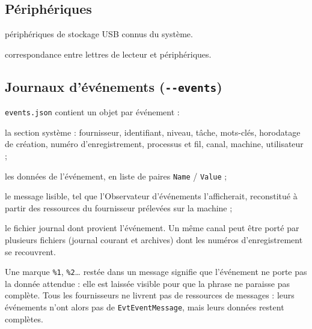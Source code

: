 \documentclass[11pt,a4paper,oneside]{report}
\newcommand{\opt}[1]{\texttt{-{}-#1}}
\newcommand{\champ}[1]{\texttt{#1}}
\newcommand{\fichier}[1]{\texttt{#1}}
\begin{document}
\subsection{Périphériques}

\begin{description}[style=nextline,leftmargin=1.2em]
  \item[\fichier{Usbstor.json}] périphériques de stockage USB connus du système.
  \item[\fichier{mounted\_device.json}] correspondance entre lettres de lecteur et
        périphériques.
\end{description}

\subsection{Journaux d'événements (\opt{events})}

\fichier{events.json} contient un objet par événement :

\begin{description}[style=nextline,leftmargin=1.2em]
  \item[\champ{EvtSystem*}] la section système : fournisseur, identifiant,
        niveau, tâche, mots-clés, horodatage de création, numéro d'enregistrement,
        processus et fil, canal, machine, utilisateur ;
  \item[\champ{EvtEventData}] les données de l'événement, en liste de paires
        \champ{Name} / \champ{Value} ;
  \item[\champ{EvtEventMessage}] le message lisible, tel que l'Observateur
        d'événements l'afficherait, reconstitué à partir des ressources du
        fournisseur prélevées sur la machine ;
  \item[\champ{EvtSourceLog}] le fichier journal dont provient l'événement. Un
        même canal peut être porté par plusieurs fichiers (journal courant et
        archives) dont les numéros d'enregistrement se recouvrent.
\end{description}

\begin{note}
Une marque \texttt{\%1}, \texttt{\%2}\ldots{} restée dans un message signifie que
l'événement ne porte pas la donnée attendue : elle est laissée visible pour que la
phrase ne paraisse pas complète. Tous les fournisseurs ne livrent pas de
ressources de messages : leurs événements n'ont alors pas de
\champ{EvtEventMessage}, mais leurs données restent complètes.
\end{note}
\end{document}
